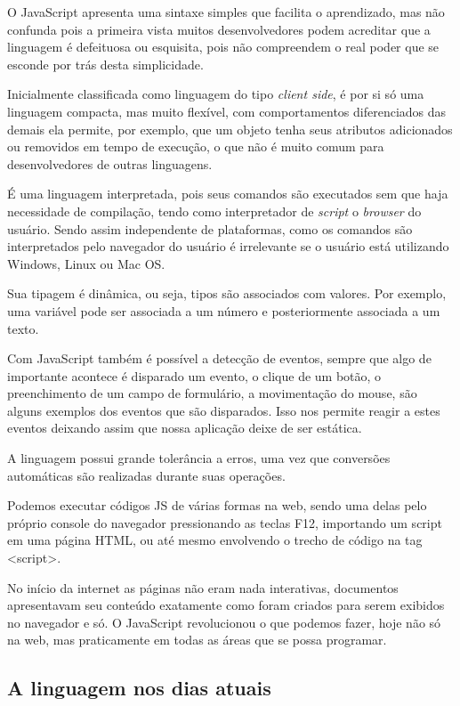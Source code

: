 \documentclass[
	12pt,				%
	openright,			%
	twoside,			%
	a4paper,			%
	english,			%
	brazil				%
	]{abntex2}
\begin{document}
O JavaScript apresenta uma sintaxe simples que facilita o aprendizado, mas não confunda pois a primeira vista muitos desenvolvedores podem acreditar que a linguagem é defeituosa ou esquisita, pois não compreendem o real poder que se esconde por trás desta simplicidade. 

Inicialmente classificada como linguagem do tipo \textit{client side}, é por si só uma linguagem compacta, mas muito flexível, com comportamentos diferenciados das demais ela permite, por exemplo, que um objeto tenha seus atributos adicionados ou removidos em tempo de execução, o que não é muito comum para desenvolvedores de outras linguagens.

É uma linguagem interpretada, pois seus comandos são executados sem que haja necessidade de compilação, tendo como interpretador de \textit{script} o \textit{browser} do usuário. Sendo assim independente de plataformas, como os comandos são interpretados pelo navegador do usuário é irrelevante se o usuário está utilizando Windows, Linux ou Mac OS.

Sua tipagem é dinâmica, ou seja, tipos são associados com valores. Por exemplo, uma variável pode ser associada a um número e posteriormente associada a um texto.

Com JavaScript também é possível a detecção de eventos, sempre que algo de importante acontece é disparado um evento, o clique de um botão, o preenchimento de um campo de formulário, a movimentação do mouse, são alguns exemplos dos eventos que são disparados. Isso nos permite reagir a estes eventos deixando assim que nossa aplicação deixe de ser estática.

A linguagem possui grande tolerância a erros, uma vez que conversões automáticas são realizadas durante suas operações.

Podemos executar códigos JS de várias formas na web, sendo uma delas pelo próprio console do navegador pressionando as teclas F12, importando um script em uma página HTML, ou até mesmo envolvendo o trecho de código na tag <script>.

No início da internet as páginas não eram nada interativas, documentos apresentavam seu conteúdo exatamente como foram criados para serem exibidos no navegador e só. O JavaScript revolucionou o que podemos fazer, hoje não só na web, mas praticamente em todas as áreas que se possa programar. 

\subsection{A linguagem nos dias atuais}
\end{document}
